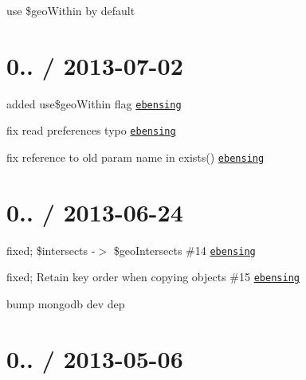 \begin{DoxyItemize}
\item use \$geo\+Within by default
\end{DoxyItemize}

\section*{0.. / 2013-\/07-\/02 }


\begin{DoxyItemize}
\item added use\$geo\+Within flag \href{https://github.com/ebensing}{\tt ebensing}
\item fix read preferences typo \href{https://github.com/ebensing}{\tt ebensing}
\item fix reference to old param name in exists() \href{https://github.com/ebensing}{\tt ebensing}
\end{DoxyItemize}

\section*{0.. / 2013-\/06-\/24 }


\begin{DoxyItemize}
\item fixed; \$intersects -\/$>$ \$geo\+Intersects \#14 \href{https://github.com/ebensing}{\tt ebensing}
\item fixed; Retain key order when copying objects \#15 \href{https://github.com/ebensing}{\tt ebensing}
\item bump mongodb dev dep
\end{DoxyItemize}

\section*{0.. / 2013-\/05-\/06 }


